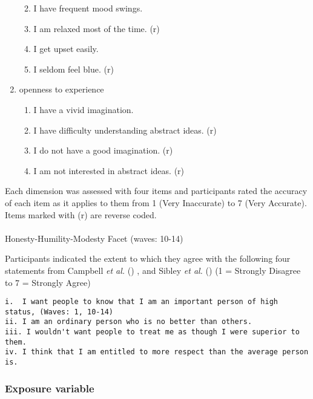 \documentclass[
  singlecolumn,
  9pt]{scrartcl}
\makeatletter
\let\oldparagraph\paragraph
\renewcommand{\paragraph}{
    \@ifstar
      \xxxParagraphStar
      \xxxParagraphNoStar
  }
\newcommand{\xxxParagraphStar}[1]{\oldparagraph*{#1}\mbox{}}
\newcommand{\xxxParagraphNoStar}[1]{\oldparagraph{#1}\mbox{}}
\providecommand{\tightlist}{%
  \setlength{\itemsep}{0pt}\setlength{\parskip}{0pt}}\usepackage{longtable,booktabs,array}
\makeatother
\begin{document}
\begin{enumerate}
  \begin{enumerate}
  \def\labelenumii{\roman{enumii}.}
  \tightlist
  \item
    I have frequent mood swings.
  \item
    I am relaxed most of the time. (r)
  \item
    I get upset easily.
  \item
    I seldom feel blue. (r)
  \end{enumerate}
\item
  openness to experience

  \begin{enumerate}
  \def\labelenumii{\roman{enumii}.}
  \tightlist
  \item
    I have a vivid imagination.
  \item
    I have difficulty understanding abstract ideas. (r)
  \item
    I do not have a good imagination. (r)
  \item
    I am not interested in abstract ideas. (r)
  \end{enumerate}
\end{enumerate}

Each dimension was assessed with four items and participants rated the
accuracy of each item as it applies to them from 1 (Very Inaccurate) to
7 (Very Accurate). Items marked with (r) are reverse coded.

\paragraph{Honesty-Humility-Modesty Facet (waves:
10-14)}\label{honesty-humility-modesty-facet-waves-10-14}

Participants indicated the extent to which they agree with the following
four statements from Campbell \emph{et al.}
() , and Sibley \emph{et al.}
() (1 = Strongly Disagree to 7 = Strongly
Agree)

\begin{verbatim}
i.  I want people to know that I am an important person of high status, (Waves: 1, 10-14)
ii. I am an ordinary person who is no better than others.
iii. I wouldn't want people to treat me as though I were superior to them.
iv. I think that I am entitled to more respect than the average person is.
\end{verbatim}

\subsubsection{Exposure variable}\label{exposure-variable}
\end{document}
